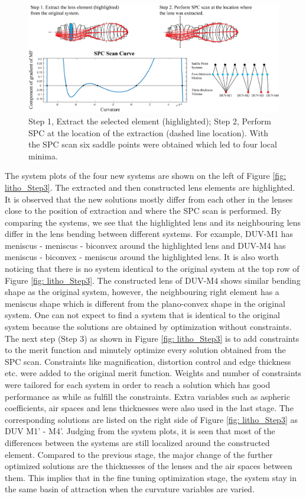 \begin{figure}[h!]
    \centering
    \includegraphics[width=\textwidth]{chapter-4/figures/Litho_Step1_2.png}
    \caption{Step 1, Extract the selected element (highlighted); Step 2, Perform SPC at the location of the extraction (dashed line location). With the SPC scan six saddle points were obtained which led to four local minima. }
    \label{fig: litho_step1_2}
\end{figure}

The system plots of the four new systems are shown on the left of Figure \ref{fig: litho_Step3}. The extracted and then constructed lens elements are highlighted. It is observed that the new solutions mostly differ from each other in the lenses close to the position of extraction and where the SPC scan is performed. By comparing the systems, we see that the highlighted lens and its neighbouring lens differ in the lens bending between different systems. For example, DUV-M1 has meniscus - meniscus - biconvex around the highlighted lens and DUV-M4 has meniscus - biconvex - meniscus around the highlighted lens. It is also worth noticing that there is no system identical to the original system at the top row of Figure \ref{fig: litho_Step3}. The constructed lens of DUV-M4 shows similar bending shape as the original system, however, the neighbouring right element has a meniscus shape which is different from the plano-convex shape in the original system. One can not expect to find a system that is identical to the original system because the solutions are obtained by optimization without constraints. The next step (Step 3) as shown in Figure \ref{fig: litho_Step3} is to add constraints to the merit function and minutely optimize every solution obtained from the SPC scan. Constraints like magnification, distortion control and edge thickness etc. were added to the original merit function. Weights and number of constraints were tailored for each system in order to reach a solution which has good performance as while as fulfill the constraints. Extra variables such as aspheric coefficients, air spaces and lens thicknesses were also used in the last stage. The corresponding solutions are listed on the right side of Figure \ref{fig: litho_Step3} as DUV M1' - M4'. Judging from the system plots, it is seen that most of the differences between the systems are still localized around the constructed element. Compared to the previous stage, the major change of the further optimized solutions are the thicknesses of the lenses and the air spaces between them. This implies that in the fine tuning optimization stage, the system stay in the same basin of attraction when the curvature variables are varied.


